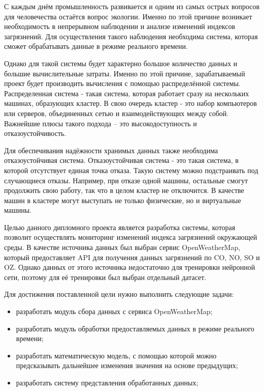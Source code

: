 \label{sec:intro}

С каждым днём промышленность развивается и одним из самых острых вопросов для человечества остаётся вопрос экологии.
Именно по этой причине возникает необходимость в непрерывном наблюдении и анализе изменений индексов загрязнений.
Для осуществления такого наблюдения необходима система, которая сможет обрабатывать данные в режиме реального времени.

Однако для такой системы будет характерно большое количество данных и большие вычислительные затраты.
Именно по этой причине, зарабатываемый проект будет производить вычисления с помощью распределённой системы.
Распределенная система - такая система, которая работает сразу на нескольких машинах, образующих кластер.
В свою очередь кластер - это набор компьютеров или серверов, объединенных сетью и взаимодействующих между собой.
Важнейшие плюсы такого подхода – это высокодоступность и отказоустойчивость.

Для обеспечивания надёжности хранимых данных также необходима отказоустойчивая система. 
Отказоустойчивая система - это такая система, в которой отсутствует единая точка отказа.
Такую систему можно подстраивать под случающиеся отказы.
Например, при отказе одной машины, остальные смогут продолжить свою работу, так что в целом кластер не отключится.
В качестве машин в кластере могут выступать не только физические, но и виртуальные машины.

Целью данного дипломного проекта является разработка системы, которая позволит осуществлять мониторинг изменений индекса загрязнений окружающей среды.
В качестве источника данных был выбран сервис OpenWeatherMap, который предоставляет API для получения данных загрязнений по CO, NO, SO и OZ.
Однако данных от этого источника недостаточно для тренировки нейронной сети, поэтому для её тренировки был выбран отдельный датасет.


Для достижения поставленной цели нужно выполнить следующие задачи:
\begin{itemize}
    \item разработать модуль сбора данных с сервиса OpenWeatherMap;
    \item разработать модуль обработки предоставляемых данных в режиме реального времени;
    \item разработать математическую модель, с помощью которой можно предсказывать дальнейшее изменения значения на основе предыдущих;
    \item разработать систему представления обработанных данных;
\end{itemize}

